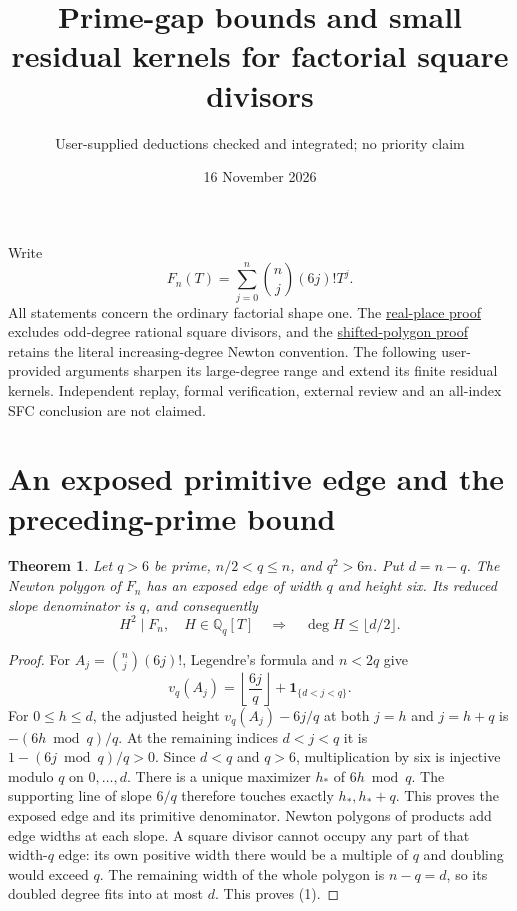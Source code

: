\documentclass[11pt]{article}
\title{Prime-gap bounds and small residual kernels for factorial square divisors}
\author{User-supplied deductions checked and integrated; no priority claim}
\date{16 November 2026}
\newtheorem{theorem}{Theorem}
\newcommand{\Q}{\mathbb Q}
\begin{document}
\maketitle
Write
\[
 F_n(T)=\sum_{j=0}^n\binom nj(6j)!T^j.
\]
All statements concern the ordinary factorial shape one. The
\href{MIXED_PRIME_RESIDUAL_WINDOWS.tex}{real-place proof} excludes
odd-degree rational square divisors, and the
\href{SLOPE_COVERAGE_AND_SHIFTED_WINDOWS.tex}{shifted-polygon proof}
retains the literal increasing-degree Newton convention. The following
user-provided arguments sharpen its large-degree range and extend its
finite residual kernels. Independent replay, formal verification,
external review and an all-index SFC conclusion are not claimed.

\section{An exposed primitive edge and the preceding-prime bound}
\begin{theorem}\label{thm:edge}
Let $q>6$ be prime, $n/2<q\le n$, and $q^2>6n$. Put $d=n-q$.
The Newton polygon of $F_n$ has an exposed edge of width $q$ and
height six. Its reduced slope denominator is $q$, and consequently
\[
 H^2\mid F_n,\quad H\in\Q_q[T]
 \quad\Longrightarrow\quad\deg H\le\lfloor d/2\rfloor. \tag{1}
\]
\end{theorem}
\begin{proof}
For $A_j=\binom nj(6j)!$, Legendre's formula and $n<2q$ give
\[
 v_q(A_j)=\left\lfloor\frac{6j}{q}\right\rfloor
             +\mathbf1_{\{d<j<q\}}. \tag{2}
\]
For $0\le h\le d$, the adjusted height $v_q(A_j)-6j/q$ at both
$j=h$ and $j=h+q$ is $-(6h\bmod q)/q$. At the remaining indices
$d<j<q$ it is $1-(6j\bmod q)/q>0$.
Since $d<q$ and $q>6$, multiplication by six is injective modulo $q$
on $0,\ldots,d$. There is a unique maximizer $h_*$ of $6h\bmod q$.
The supporting line of slope $6/q$ therefore touches exactly
$h_*,h_*+q$. This proves the exposed edge and its primitive denominator.
Newton polygons of products add edge widths at each slope. A square
divisor cannot occupy any part of that width-$q$ edge: its own positive
width there would be a multiple of $q$ and doubling would exceed $q$.
The remaining width of the whole polygon is $n-q=d$, so its doubled
degree fits into at most $d$. This proves (1).
\end{proof}
\end{document}
